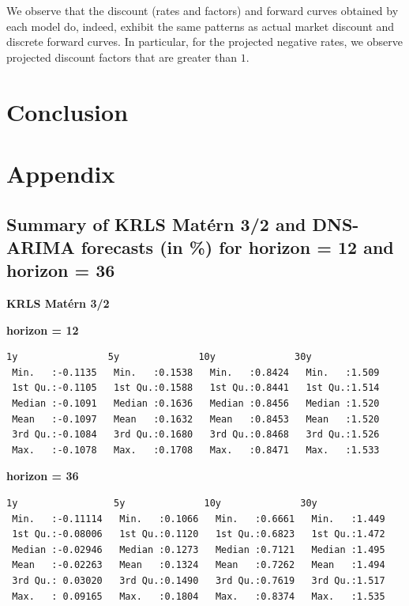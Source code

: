 We observe that the discount (rates and factors) and forward curves obtained by each model do, indeed, exhibit the same patterns as actual market discount and discrete forward curves. In particular, for the projected negative rates, we observe projected discount factors that are greater than $1$. 

\newpage

\section{Conclusion}

\newpage

\section{Appendix}

\subsection{Summary of KRLS Mat\'ern 3/2 and DNS-ARIMA forecasts (in \%) for horizon = 12 and horizon = 36}

\textbf{KRLS Mat\'ern 3/2}

\textbf{horizon = 12}

\begin{verbatim}
1y                5y              10y              30y       
 Min.   :-0.1135   Min.   :0.1538   Min.   :0.8424   Min.   :1.509  
 1st Qu.:-0.1105   1st Qu.:0.1588   1st Qu.:0.8441   1st Qu.:1.514  
 Median :-0.1091   Median :0.1636   Median :0.8456   Median :1.520  
 Mean   :-0.1097   Mean   :0.1632   Mean   :0.8453   Mean   :1.520  
 3rd Qu.:-0.1084   3rd Qu.:0.1680   3rd Qu.:0.8468   3rd Qu.:1.526  
 Max.   :-0.1078   Max.   :0.1708   Max.   :0.8471   Max.   :1.533
\end{verbatim}

\textbf{horizon = 36}

\begin{verbatim}
1y                 5y              10y              30y       
 Min.   :-0.11114   Min.   :0.1066   Min.   :0.6661   Min.   :1.449  
 1st Qu.:-0.08006   1st Qu.:0.1120   1st Qu.:0.6823   1st Qu.:1.472  
 Median :-0.02946   Median :0.1273   Median :0.7121   Median :1.495  
 Mean   :-0.02263   Mean   :0.1324   Mean   :0.7262   Mean   :1.494  
 3rd Qu.: 0.03020   3rd Qu.:0.1490   3rd Qu.:0.7619   3rd Qu.:1.517  
 Max.   : 0.09165   Max.   :0.1804   Max.   :0.8374   Max.   :1.535 
\end{verbatim}

